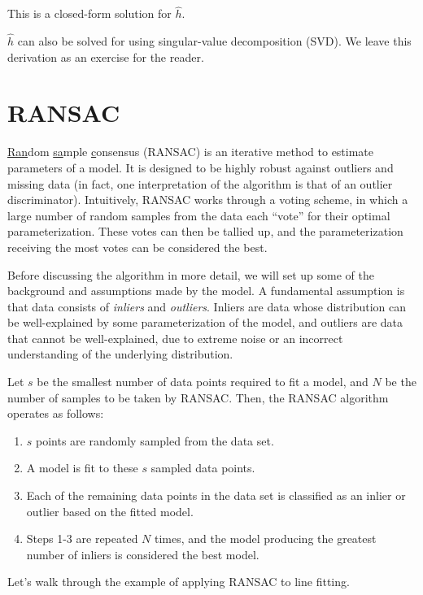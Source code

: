 \documentclass[a4paper, 12pt]{article}
\begin{document}
This is a closed-form solution for $\hat{h}$.  

$\hat{h}$ can also be solved for using singular-value decomposition (SVD).  We leave this derivation as an exercise for the reader.

\section{RANSAC}

\underline{Ran}dom \underline{sa}mple \underline{c}onsensus (RANSAC) is an iterative method to estimate parameters of a model.  It is designed to be highly robust against outliers and missing data (in fact, one interpretation of the algorithm is that of an outlier discriminator).  Intuitively, RANSAC works through a voting scheme, in which a large number of random samples from the data each ``vote'' for their optimal parameterization.  These votes can then be tallied up, and the parameterization receiving the most votes can be considered the best.

Before discussing the algorithm in more detail, we will set up some of the background and assumptions made by the model.  A fundamental assumption is that data consists of \textit{inliers} and \textit{outliers}.  Inliers are data whose distribution can be well-explained by some parameterization of the model, and outliers are data that cannot be well-explained, due to extreme noise or an incorrect understanding of the underlying distribution.  

Let $s$ be the smallest number of data points required to fit a model, and $N$ be the number of samples to be taken by RANSAC.  Then, the RANSAC algorithm operates as follows:
\begin{enumerate}
\item $s$ points are randomly sampled from the data set.
\item A model is fit to these $s$ sampled data points.
\item Each of the remaining data points in the data set is classified as an inlier or outlier based on the fitted model.
\item Steps 1-3 are repeated $N$ times, and the model producing the greatest number of inliers is considered the best model.
\end{enumerate}

Let's walk through the example of applying RANSAC to line fitting.
\end{document}
